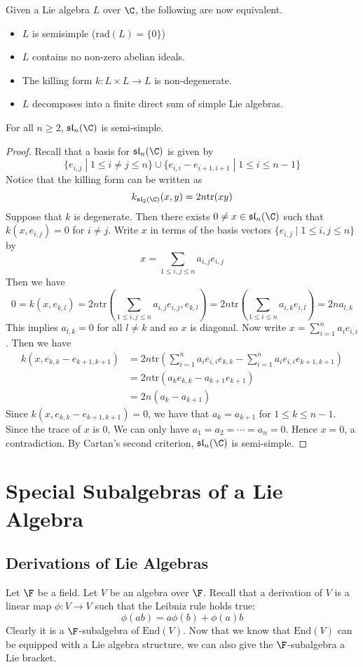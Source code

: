 \documentclass[a4paper]{article}
\begin{document}
Given a Lie algebra $L$ over $\C$, the following are now equivalent. 
\begin{itemize}
\item $L$ is semisimple ($\text{rad}(L)=\{0\}$)
\item $L$ contains no non-zero abelian ideals. 
\item The killing form $k:L\times L\to L$ is non-degenerate. 
\item $L$ decomposes into a finite direct sum of simple Lie algebras. 
\end{itemize}

\begin{eg}{}{} For all $n\geq 2$, $\mathfrak{sl}_n(\C)$ is semi-simple. \tcbline
\begin{proof}
Recall that a basis for $\mathfrak{sl}_n(\C)$ is given by $$\{e_{i,j}\;|\;1\leq i\neq j\leq n\}\cup\{e_{i,i}-e_{i+1,i+1}\;|\;1\leq i\leq n-1\}$$ Notice that the killing form can be written as $$k_{\mathfrak{sl}_2(\C)}(x,y)=2n\text{tr}(xy)$$ Suppose that $k$ is degenerate. Then there exists $0\neq x\in\mathfrak{sl}_n(\C)$ such that $k(x,e_{i,j})=0$ for $i\neq j$. Write $x$ in terms of the basis vectors $\{e_{i,j}\;|\;1\leq i,j\leq n\}$ by $$x=\sum_{1\leq i,j\leq n}a_{i,j}e_{i,j}$$ Then we have $$0=k(x,e_{k,l})=2n\text{tr}\left(\sum_{1\leq i,j\leq n}a_{i,j}e_{i,j},e_{k,l}\right)=2n\text{tr}\left(\sum_{1\leq i\leq n}a_{i,k}e_{i,l}\right)=2na_{l,k}$$ This implies $a_{l,k}=0$ for all $l\neq k$ and so $x$ is diagonal. Now write $x=\sum_{i=1}^na_ie_{i,i}$. Then we have 
\begin{align*}
k(x,e_{k,k}-e_{k+1,k+1})&=2n\text{tr}\left(\sum_{i=1}^na_ie_{i,i}e_{k,k}-\sum_{i=1}^na_ie_{i,i}e_{k+1,k+1}\right)\\
&=2n\text{tr}(a_ke_{k,k}-a_{k+1}e_{k+1})\\
&=2n(a_k-a_{k+1})
\end{align*}
Since $k(x,e_{k,k}-e_{k+1,k+1})=0$, we have that $a_k=a_{k+1}$ for $1\leq k\leq n-1$. Since the trace of $x$ is $0$, We can only have $a_1=a_2=\cdots=a_n=0$. Hence $x=0$, a contradiction. By Cartan's second criterion, $\mathfrak{sl}_n(\C)$ is semi-simple. 
\end{proof}
\end{eg}

\pagebreak
\section{Special Subalgebras of a Lie Algebra}
\subsection{Derivations of Lie Algebras}
 Let $\F$ be a field. Let $V$ be an algebra over $\F$. Recall that a derivation of $V$ is a linear map $\phi:V\to V$ such that the Leibniz rule holds true: $$\phi(ab)=a\phi(b)+\phi(a)b$$ Clearly it is a $\F$-subalgebra of $\text{End}(V)$. Now that we know that $\text{End}(V)$ can be equipped with a Lie algebra structure, we can also give the $\F$-subalgebra a Lie bracket. 
\end{document}
